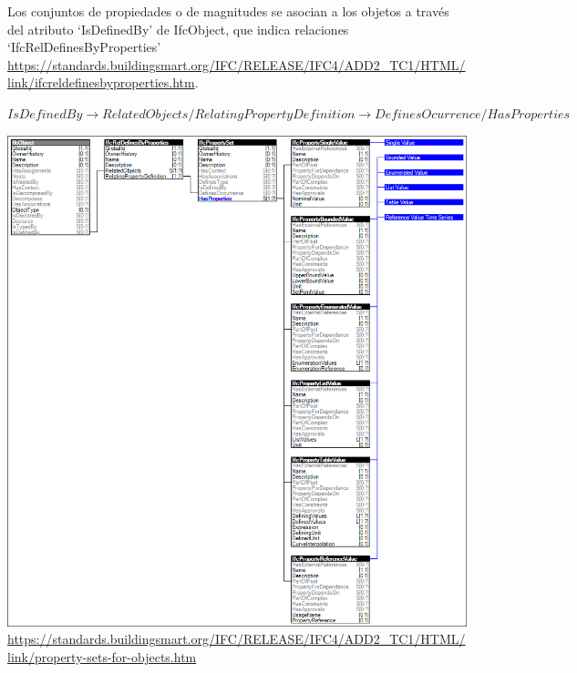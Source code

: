 \documentclass[spanish,12pt,a4paper,final,oneside]{book}
\begin{document}
Los conjuntos de propiedades o de magnitudes se asocian a los objetos a través del atributo `IsDefinedBy' de IfcObject, que indica relaciones `IfcRelDefinesByProperties' \url{https://standards.buildingsmart.org/IFC/RELEASE/IFC4/ADD2_TC1/HTML/link/ifcreldefinesbyproperties.htm}. 

\begin{small}
$IsDefinedBy \rightarrow RelatedObjects / RelatingPropertyDefinition \rightarrow DefinesOcurrence / HasProperties$
\end{small}
\includegraphics[width=\textwidth]{property-sets-for-objects}
\\ \url{https://standards.buildingsmart.org/IFC/RELEASE/IFC4/ADD2_TC1/HTML/link/property-sets-for-objects.htm}
\end{document}
